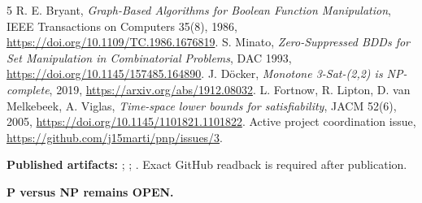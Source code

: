 \documentclass[11pt]{article}
\begin{document}
\begin{thebibliography}{5}
 R. E. Bryant, \emph{Graph-Based Algorithms for Boolean Function Manipulation}, IEEE Transactions on Computers 35(8), 1986, \url{https://doi.org/10.1109/TC.1986.1676819}.
 S. Minato, \emph{Zero-Suppressed BDDs for Set Manipulation in Combinatorial Problems}, DAC 1993, \url{https://doi.org/10.1145/157485.164890}.
 J. D\"ocker, \emph{Monotone 3-Sat-(2,2) is NP-complete}, 2019, \url{https://arxiv.org/abs/1912.08032}.
 L. Fortnow, R. Lipton, D. van Melkebeek, A. Viglas, \emph{Time-space lower bounds for satisfiability}, JACM 52(6), 2005, \url{https://doi.org/10.1145/1101821.1101822}.
 Active project coordination issue, \url{https://github.com/j15marti/pnp/issues/3}.
\end{thebibliography}

\noindent\textbf{Published artifacts:} ; ; .  Exact GitHub readback is required after publication.

\noindent\textbf{P versus NP remains OPEN.}
\end{document}
